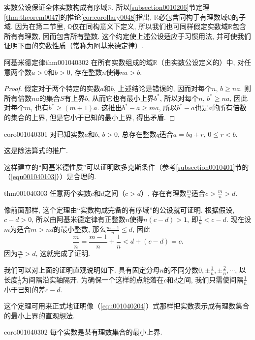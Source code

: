 实数公设保证全体实数构成有序域$\mathbb{R}$, 所以\ref{subsection0010206}节定理\ref{thm:theorem0047}的推论\ref{cor:corollary0048}指出, $\mathbb{R}$必包含同构于有理数域$\mathbb{Q}$的子域. 因为在第二节里, $\mathbb{Q}$仅在同构意义下定义, 所以我们也可同样假定实数域$\mathbb{R}$包含所有有理数, 因而包含所有整数. 这个约定使上述公设适应于习惯用法, 并可使我们证明下面的实数性质（常称为阿基米德定律）. 
\begin{theorem}{阿基米德定律}{thm001040302}
在所有实数组成的域$\mathbb{R}$（由实数公设定义的）中, 对任意两个数$a > 0$和$b>0$, 存在整数$n$使得$na > b$. 
\end{theorem}
\begin{proof}
假定对于两个特定的实数$a$和$b$, 上述结论是错误的, 因而对每个$n$, $b \ge na$. 则所有倍数$na$的集合$S$有上界$b$, 从而它也有最小上界$b^*$, 所以对每个$n$, $b^* \ge na$, 因此对每个$m$, 也有$b^* \ge (m+1)a$. 这推出$b^*-a \ge ma$, 所以$b^*-a$也是$a$的所有倍数的集合的上界, 但是它小于已知的最小上界, 得出矛盾. 
\end{proof}

\begin{corollary}{}{coro001040301}
对已知实数$a$和$b$, $b > 0$, 总存在整数$q$适合$a = bq + r$, $0 \le r < b$. 
\end{corollary}

这是除法算式的推广. 

这样建立的“阿基米德性质”可以证明欧多克斯条件（参考\ref{subsection0010401}节的（\ref{equ001040103}））是合理的. 

\begin{theorem}{}{thm001040303}
任意两个实数$c$和$d$之间（$c > d$）, 存在有理数$\frac{m}{n}$适合$c > \frac{m}{n} > d$. 
\end{theorem}

像前面那样, 这个定理由“实数构成完备的有序域”的公设就可证明. 根据假设, $c-d > 0$, 所以由阿基米德定律有正整数$n$使得$n(c-d)>1$, 即$\frac{1}{n} < c-d$. 现在设$m$为适合$m>nd$的最小整数, 那么$\frac{m-1}{n} \le d$, 因此
\[
\frac{m}{n} = \frac{m-1}{n} + \frac{1}{n} < d + (c-d)=c.
\]
因为$\frac{m}{n} > d$, 这就完成了证明. 

我们可以对上面的证明直观说明如下. 具有固定分母$n$的不同分数$0, \pm{\frac{1}{n}},\pm{\frac{2}{n}},\cdots$, 以长度$\frac{1}{n}$为间隔沿实轴隔开. 为确保一个这样的点能落在$c$和$d$之间, 我们只需使间隔$\frac{1}{n}$小于已知的差$c-d$. 

这个定理可用来正式地证明像（\ref{equ001040204}）式那样把实数表示成有理数集合的最小上界的直观想法. 

\begin{corollary}{}{coro001040302}
每个实数是某有理数集合的最小上界. 
\end{corollary}

